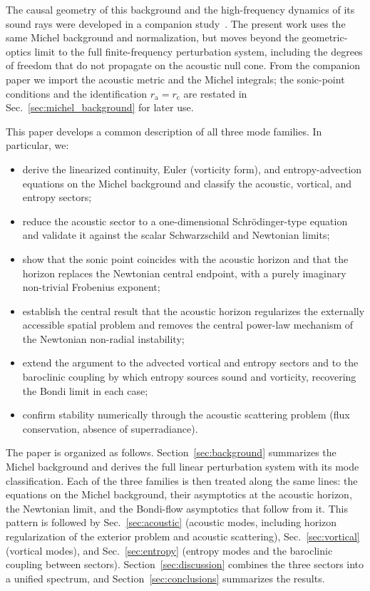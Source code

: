 \documentclass[12pt,a4paper,preprint,nopreprintline]{elsarticle}
\begin{document}
The causal geometry of this background and the high-frequency dynamics of its sound rays were developed in a companion study~\cite{SemyannikovAV_AcousticGeometryAndSoundRayDynamics_2026}. The present work uses the same Michel background and normalization, but moves beyond the geometric-optics limit to the full finite-frequency perturbation system, including the degrees of freedom that do not propagate on the acoustic null cone. From the companion paper we import the acoustic metric and the Michel integrals; the sonic-point conditions and the identification $r_{\mathrm{a}}=r_{\mathrm{c}}$ are restated in Sec.~\ref{sec:michel_background} for later use.

This paper develops a common description of all three mode families. In particular, we:
\begin{itemize}
    \item derive the linearized continuity, Euler (vorticity form), and entropy-advection equations on the Michel background and classify the acoustic, vortical, and entropy sectors;
    \item reduce the acoustic sector to a one-dimensional Schr\"odinger-type equation and validate it against the scalar Schwarzschild and Newtonian limits;
    \item show that the sonic point coincides with the acoustic horizon and that the horizon replaces the Newtonian central endpoint, with a purely imaginary non-trivial Frobenius exponent;
    \item establish the central result that the acoustic horizon regularizes the externally accessible spatial problem and removes the central power-law mechanism of the Newtonian non-radial instability;
    \item extend the argument to the advected vortical and entropy sectors and to the baroclinic coupling by which entropy sources sound and vorticity, recovering the Bondi limit in each case;
    \item confirm stability numerically through the acoustic scattering problem (flux conservation, absence of superradiance).
\end{itemize}

The paper is organized as follows. Section~\ref{sec:background} summarizes the Michel background and derives the full linear perturbation system with its mode classification. Each of the three families is then treated along the same lines: the equations on the Michel background, their asymptotics at the acoustic horizon, the Newtonian limit, and the Bondi-flow asymptotics that follow from it. This pattern is followed by Sec.~\ref{sec:acoustic} (acoustic modes, including horizon regularization of the exterior problem and acoustic scattering), Sec.~\ref{sec:vortical} (vortical modes), and Sec.~\ref{sec:entropy} (entropy modes and the baroclinic coupling between sectors). Section~\ref{sec:discussion} combines the three sectors into a unified spectrum, and Section~\ref{sec:conclusions} summarizes the results.
\end{document}
